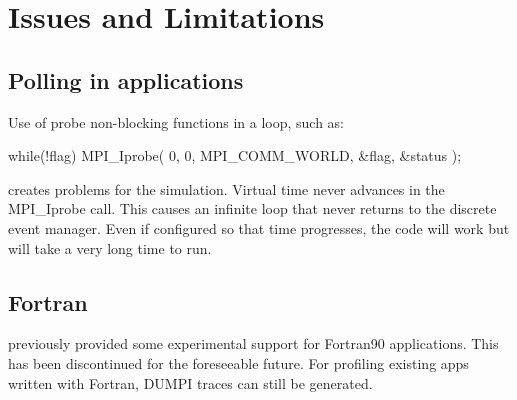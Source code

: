 
\chapter{Issues and Limitations}
\section{Polling in applications}

Use of probe non-blocking functions in a loop, such as:


\begin{CppCode}
while(!flag){
 MPI_Iprobe( 0, 0, MPI_COMM_WORLD, &flag, &status );
}
\end{CppCode}
creates problems for the simulation. Virtual time never advances in the MPI\_Iprobe call. 
This causes an infinite loop that never returns to the discrete event manager. 
Even if configured so that time progresses, the code will work but will take a very long time to run.

\section{Fortran}
\label{subsec:issues:fortran}

\sstmacro previously provided some experimental support for Fortran90 applications. 
This has been discontinued for the foreseeable future.
For profiling existing apps written with Fortran, DUMPI traces can still be generated. 




